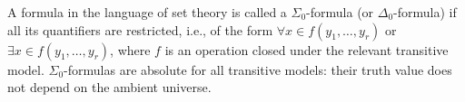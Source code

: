 A formula in the language of set theory is called a $\Sigma_0$-formula (or $\Delta_0$-formula) if all its quantifiers are restricted, i.e., of the form $\forall x \in f(y_1, \ldots, y_r)$ or $\exists x \in f(y_1, \ldots, y_r)$, where $f$ is an operation closed under the relevant transitive model. $\Sigma_0$-formulas are absolute for all transitive models: their truth value does not depend on the ambient universe.